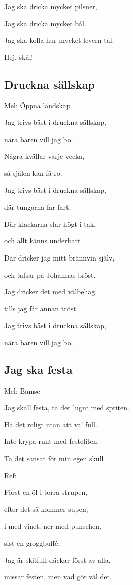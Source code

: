 Jag ska dricka mycket pilsner,

Jag ska dricka mycket bål.

Jag ska kolla hur mycket levern tål.

Hej, skål! \bigskip

\subsection{\textbf{Druckna sällskap}}

Mel: Öppna landskap \bigskip

Jag trivs bäst i druckna sällskap,

nära baren vill jag bo.

Några kvällar varje vecka,

så själen kan få ro.

Jag trivs bäst i druckna sällskap,

där tungorna får fart.

Där klackarna slår högt i tak,

och allt känns underbart

Där dricker jag mitt brännvin själv,

och tafsar på Johannas bröst.

Jag dricker det med välbehag.

tills jag får annan tröst.

Jag trivs bäst i druckna sällskap,

nära baren vill jag bo. 

\subsection{\textbf{Jag ska festa }}

Mel: Bamse \bigskip

Jag skall festa, ta det lugnt med spriten.

Ha det roligt utan att va’ full.

Inte krypa runt med festeliten.

Ta det sansat för min egen skull\bigskip

Ref:

Först en öl i torra strupen,

efter det så kommer supen,

i med vinet, ner med punschen,

sist en groggbuffé.\bigskip

Jag är skitfull däckar först av alla,

missar festen, men vad gör väl det.

